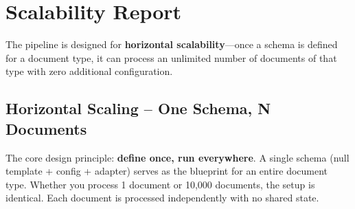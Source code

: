 \documentclass[12pt,a4paper]{report}
\begin{document}
\chapter{Scalability Report}

The pipeline is designed for \textbf{horizontal scalability}---once a schema is defined for a document type, it can process an unlimited number of documents of that type with zero additional configuration.

\section{Horizontal Scaling -- One Schema, N Documents}

The core design principle: \textbf{define once, run everywhere}. A single schema (null template + config + adapter) serves as the blueprint for an entire document type. Whether you process 1 document or 10,000 documents, the setup is identical. Each document is processed independently with no shared state.
\end{document}
